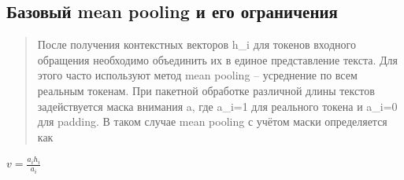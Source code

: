\documentclass[
]{article}
\begin{document}
\hypertarget{ux431ux430ux437ux43eux432ux44bux439-mean-pooling-ux438-ux435ux433ux43e-ux43eux433ux440ux430ux43dux438ux447ux435ux43dux438ux44f}{%
\subsection{Базовый mean pooling и его
ограничения}\label{ux431ux430ux437ux43eux432ux44bux439-mean-pooling-ux438-ux435ux433ux43e-ux43eux433ux440ux430ux43dux438ux447ux435ux43dux438ux44f}}

\begin{quote}
После получения контекстных векторов h\_i для токенов входного обращения
необходимо объединить их в единое представление текста. Для этого часто
используют метод mean pooling -- усреднение по всем реальным токенам.
При пакетной обработке различной длины текстов задействуется маска
внимания a, где a\_i=1 для реального токена и a\_i=0 для padding. В
таком случае mean pooling с учётом маски определяется как
\end{quote}

\(v = \frac{a_{i}h_{i}}{a_{i}}\)
\end{document}
